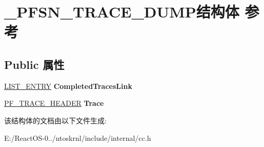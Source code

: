 \hypertarget{struct___p_f_s_n___t_r_a_c_e___d_u_m_p}{}\section{\+\_\+\+P\+F\+S\+N\+\_\+\+T\+R\+A\+C\+E\+\_\+\+D\+U\+M\+P结构体 参考}
\label{struct___p_f_s_n___t_r_a_c_e___d_u_m_p}
\subsection*{Public 属性}
\begin{DoxyCompactItemize}
\item 
\mbox{\label{struct___p_f_s_n___t_r_a_c_e___d_u_m_p_aabeb5bfa7f2ab77d2df1217f39762d84}} 
\hyperlink{struct___l_i_s_t___e_n_t_r_y}{L\+I\+S\+T\+\_\+\+E\+N\+T\+RY} {\bfseries Completed\+Traces\+Link}
\item 
\mbox{\label{struct___p_f_s_n___t_r_a_c_e___d_u_m_p_aee5fb1cd4886a5ed1a8305d0acc079a9}} 
\hyperlink{struct___p_f___t_r_a_c_e___h_e_a_d_e_r}{P\+F\+\_\+\+T\+R\+A\+C\+E\+\_\+\+H\+E\+A\+D\+ER} {\bfseries Trace}
\end{DoxyCompactItemize}


该结构体的文档由以下文件生成\+:\begin{DoxyCompactItemize}
\item 
E\+:/\+React\+O\+S-\/0../ntoskrnl/include/internal/cc.\+h\end{DoxyCompactItemize}

